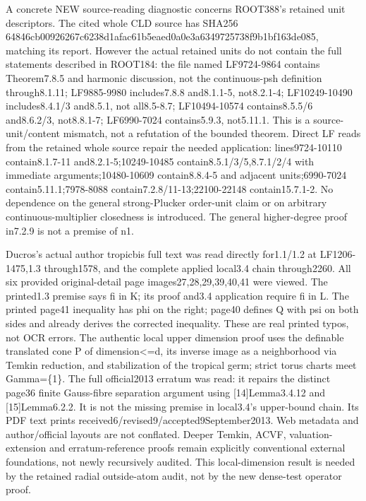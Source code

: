 \documentclass[11pt]{article}
\begin{document}
A concrete NEW source-reading diagnostic concerns ROOT388's retained unit descriptors. The cited whole CLD source has SHA256 64846cb00926267c6238d1afac61b5eaed0a0e3a6349725738f9b1bf163de085, matching its report. However the actual retained units do not contain the full statements described in ROOT184: the file named LF9724-9864 contains Theorem7.8.5 and harmonic discussion, not the continuous-psh definition through8.1.11; LF9885-9980 includes7.8.8 and8.1.1-5, not8.2.1-4; LF10249-10490 includes8.4.1/3 and8.5.1, not all8.5-8.7; LF10494-10574 contains8.5.5/6 and8.6.2/3, not8.8.1-7; LF6990-7024 contains5.9.3, not5.11.1. This is a source-unit/content mismatch, not a refutation of the bounded theorem. Direct LF reads from the retained whole source repair the needed application: lines9724-10110 contain8.1.7-11 and8.2.1-5;10249-10485 contain8.5.1/3/5,8.7.1/2/4 with immediate arguments;10480-10609 contain8.8.4-5 and adjacent units;6990-7024 contain5.11.1;7978-8088 contain7.2.8/11-13;22100-22148 contain15.7.1-2. No dependence on the general strong-Plucker order-unit claim or on arbitrary continuous-multiplier closedness is introduced. The general higher-degree proof in7.2.9 is not a premise of n1.

Ducros's actual author tropicbis full text was read directly for1.1/1.2 at LF1206-1475,1.3 through1578, and the complete applied local3.4 chain through2260. All six provided original-detail page images27,28,29,39,40,41 were viewed. The printed1.3 premise says fi in K; its proof and3.4 application require fi in L. The printed page41 inequality has phi on the right; page40 defines Q with psi on both sides and already derives the corrected inequality. These are real printed typos, not OCR errors. The authentic local upper dimension proof uses the definable translated cone P of dimension<=d, its inverse image as a neighborhood via Temkin reduction, and stabilization of the tropical germ; strict torus charts meet Gamma=\{1\}. The full official2013 erratum was read: it repairs the distinct page36 finite Gauss-fibre separation argument using [14]Lemma3.4.12 and [15]Lemma6.2.2. It is not the missing premise in local3.4's upper-bound chain. Its PDF text prints received6/revised9/accepted9September2013. Web metadata and author/official layouts are not conflated. Deeper Temkin, ACVF, valuation-extension and erratum-reference proofs remain explicitly conventional external foundations, not newly recursively audited. This local-dimension result is needed by the retained radial outside-atom audit, not by the new dense-test operator proof.
\end{document}
